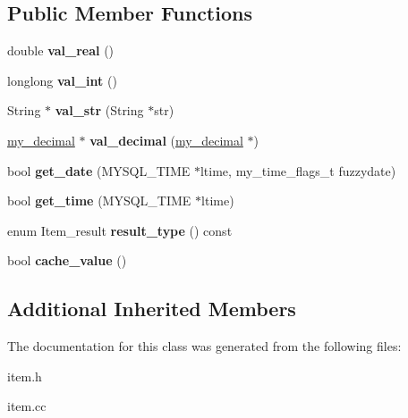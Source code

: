 \subsection*{Public Member Functions}
\begin{DoxyCompactItemize}
\item 
\mbox{\label{classItem__cache__real_a5f3cfed4dbc3aa3ac85258279072961c}} 
double {\bfseries val\+\_\+real} ()
\item 
\mbox{\label{classItem__cache__real_ae78d3c476e1c5e97947d4d26eddf856c}} 
longlong {\bfseries val\+\_\+int} ()
\item 
\mbox{\label{classItem__cache__real_acb374e762f80fcfee9ae8b5d9a1f85e8}} 
String $\ast$ {\bfseries val\+\_\+str} (String $\ast$str)
\item 
\mbox{\label{classItem__cache__real_a0fe79c6e9bafed79c70380047c7b4032}} 
\mbox{\hyperlink{classmy__decimal}{my\+\_\+decimal}} $\ast$ {\bfseries val\+\_\+decimal} (\mbox{\hyperlink{classmy__decimal}{my\+\_\+decimal}} $\ast$)
\item 
\mbox{\label{classItem__cache__real_ad10072e382d31d8bfef8733fc9318413}} 
bool {\bfseries get\+\_\+date} (M\+Y\+S\+Q\+L\+\_\+\+T\+I\+ME $\ast$ltime, my\+\_\+time\+\_\+flags\+\_\+t fuzzydate)
\item 
\mbox{\label{classItem__cache__real_a967f01f62487a764982145649991ebf0}} 
bool {\bfseries get\+\_\+time} (M\+Y\+S\+Q\+L\+\_\+\+T\+I\+ME $\ast$ltime)
\item 
\mbox{\label{classItem__cache__real_a99d4695c9dad0f8118f94caa231269e8}} 
enum Item\+\_\+result {\bfseries result\+\_\+type} () const
\item 
\mbox{\label{classItem__cache__real_a801e7d5b244f5bfd97fe5d56f4f78bc6}} 
bool {\bfseries cache\+\_\+value} ()
\end{DoxyCompactItemize}
\subsection*{Additional Inherited Members}


The documentation for this class was generated from the following files\+:\begin{DoxyCompactItemize}
\item 
item.\+h\item 
item.\+cc\end{DoxyCompactItemize}
